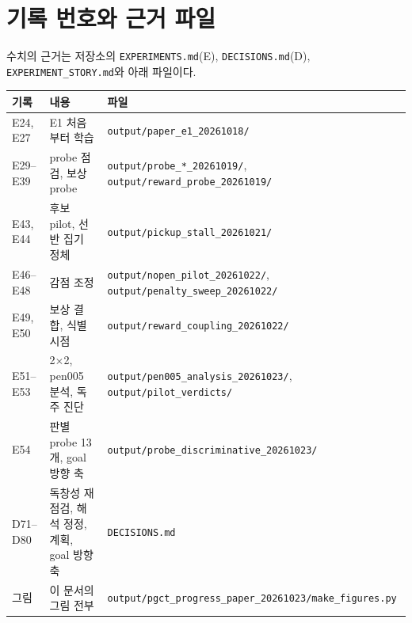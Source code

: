 \documentclass[10pt]{article}
\begin{document}
\section{기록 번호와 근거 파일}
수치의 근거는 저장소의 \texttt{EXPERIMENTS.md}(E), \texttt{DECISIONS.md}(D), \texttt{EXPERIMENT\_STORY.md}와 아래 파일이다.
\begin{center}
\begin{tabularx}{\textwidth}{>{\raggedright\arraybackslash}p{2.6cm} L L}
\toprule
기록 & 내용 & 파일 \\
\midrule
E24, E27 & E1 처음부터 학습 & \texttt{output/paper\_e1\_20261018/} \\
E29--E39 & probe 점검, 보상 probe & \texttt{output/probe\_*\_20261019/}, \texttt{output/reward\_probe\_20261019/} \\
E43, E44 & 후보 pilot, 선반 집기 정체 & \texttt{output/pickup\_stall\_20261021/} \\
E46--E48 & 감점 조정 & \texttt{output/nopen\_pilot\_20261022/}, \texttt{output/penalty\_sweep\_20261022/} \\
E49, E50 & 보상 결합, 식별 시점 & \texttt{output/reward\_coupling\_20261022/} \\
E51--E53 & 2$\times$2, pen005 분석, 독주 진단 & \texttt{output/pen005\_analysis\_20261023/}, \texttt{output/pilot\_verdicts/} \\
E54 & 판별 probe 13개, goal 방향 축 & \texttt{output/probe\_discriminative\_20261023/} \\
D71--D80 & 독창성 재점검, 해석 정정, 계획, goal 방향 축 & \texttt{DECISIONS.md} \\
그림 & 이 문서의 그림 전부 & \texttt{output/pgct\_progress\_paper\_20261023/make\_figures.py} \\
\bottomrule
\end{tabularx}
\end{center}
\end{document}

